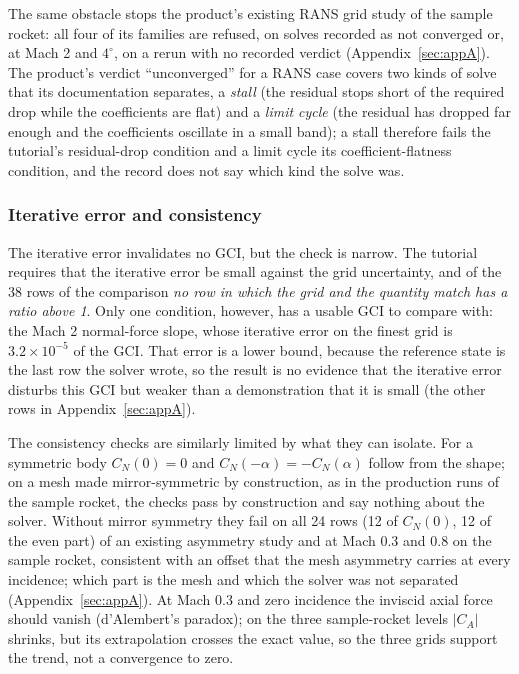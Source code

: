 \documentclass[twocolumn]{labreport}
\begin{document}
The same obstacle stops the product's existing RANS grid study of the sample rocket: all four of its families are refused, on solves recorded as not converged or, at Mach 2 and $4^\circ$, on a rerun with no recorded verdict (Appendix~\ref{sec:appA}).
The product's verdict ``unconverged'' for a RANS case covers two kinds of solve that its documentation separates, a \emph{stall} (the residual stops short of the required drop while the coefficients are flat) and a \emph{limit cycle} (the residual has dropped far enough and the coefficients oscillate in a small band); a stall therefore fails the tutorial's residual-drop condition and a limit cycle its coefficient-flatness condition, and the record does not say which kind the solve was.

\subsubsection{Iterative error and consistency}
\label{sec:iter}
\label{sec:consistency}

The iterative error invalidates no GCI, but the check is narrow.
The tutorial requires that the iterative error be small against the grid uncertainty, and of the 38 rows of the comparison \emph{no row in which the grid and the quantity match has a ratio above 1}.
Only one condition, however, has a usable GCI to compare with: the Mach 2 normal-force slope, whose iterative error on the finest grid is $3.2\times10^{-5}$ of the GCI.
That error is a lower bound, because the reference state is the last row the solver wrote, so the result is no evidence that the iterative error disturbs this GCI but weaker than a demonstration that it is small (the other rows in Appendix~\ref{sec:appA}).

The consistency checks are similarly limited by what they can isolate.
For a symmetric body $C_N(0)=0$ and $C_N(-\alpha)=-C_N(\alpha)$ follow from the shape; on a mesh made mirror-symmetric by construction, as in the production runs of the sample rocket, the checks pass by construction and say nothing about the solver.
Without mirror symmetry they fail on all 24 rows (12 of $C_N(0)$, 12 of the even part) of an existing asymmetry study and at Mach 0.3 and 0.8 on the sample rocket, consistent with an offset that the mesh asymmetry carries at every incidence; which part is the mesh and which the solver was not separated (Appendix~\ref{sec:appA}).
At Mach 0.3 and zero incidence the inviscid axial force should vanish (d'Alembert's paradox); on the three sample-rocket levels $|C_A|$ shrinks, but its extrapolation crosses the exact value, so the three grids support the trend, not a convergence to zero.
\end{document}
